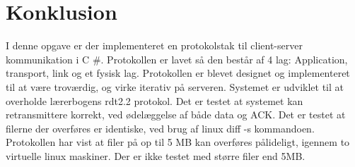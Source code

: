 \chapter{Konklusion}\label{ch:konclusion}
I denne opgave er der implementeret en protokolstak til client-server kommunikation i C \#. Protokollen er lavet så den består af 4 lag: Application, transport, link og et fysisk lag. Protokollen er blevet designet og implementeret til at være troværdig, og virke iterativ på serveren. Systemet er udviklet til at overholde lærerbogens rdt2.2 protokol. Det er testet at systemet kan retransmittere korrekt, ved ødelæggelse af både data og ACK. Det er testet at filerne der overføres er identiske, ved brug af linux diff -s kommandoen. Protokollen har vist at filer på op til 5 MB kan overføres pålideligt, igennem to virtuelle linux maskiner. Der er ikke testet med større filer end 5MB. 
